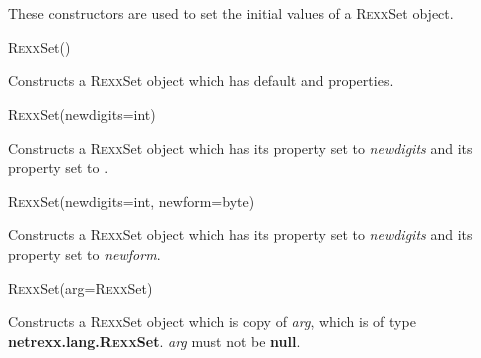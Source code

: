 \section{}\label{}
 
These constructors are used to set the initial values of a R\textsc{exx}Set
object.
\begin{description}
\item{R\textsc{exx}Set()}

Constructs a R\textsc{exx}Set object which has default  and
 properties.
\item{R\textsc{exx}Set(newdigits=int)}

Constructs a R\textsc{exx}Set object which has its  property set
to \emph{newdigits} and its  property set
to .
\item{R\textsc{exx}Set(newdigits=int, newform=byte)}

Constructs a R\textsc{exx}Set object which has its  property set
to \emph{newdigits} and its  property set to
\emph{newform}.
\item{R\textsc{exx}Set(arg=R\textsc{exx}Set)}

Constructs a R\textsc{exx}Set object which is copy of \emph{arg}, which is of
type \textbf{netrexx.lang.R\textsc{exx}Set}.
\emph{arg} must not be \textbf{null}.
\end{description}
\section{}\label{}
 
